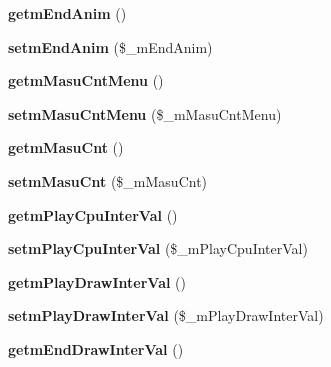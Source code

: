\begin{DoxyCompactItemize}
{\bfseries getm\+End\+Anim} ()
\item 
\mbox{\label{class_reversi_setting_aa999b168a52630ff1e339e8131589f36}} 
{\bfseries setm\+End\+Anim} (\$\+\_\+m\+End\+Anim)
\item 
\mbox{\label{class_reversi_setting_a7c7134b5c9b4920861676c8aa65fc8bf}} 
{\bfseries getm\+Masu\+Cnt\+Menu} ()
\item 
\mbox{\label{class_reversi_setting_a124deeade23c86db5106d01abd2816d3}} 
{\bfseries setm\+Masu\+Cnt\+Menu} (\$\+\_\+m\+Masu\+Cnt\+Menu)
\item 
\mbox{\label{class_reversi_setting_a32cebf699f9aa19d9053c143c3562d3a}} 
{\bfseries getm\+Masu\+Cnt} ()
\item 
\mbox{\label{class_reversi_setting_ad50e5fa90e6a2f53bf71ed04bed603ae}} 
{\bfseries setm\+Masu\+Cnt} (\$\+\_\+m\+Masu\+Cnt)
\item 
\mbox{\label{class_reversi_setting_a396427325eccd710236622c2122aef39}} 
{\bfseries getm\+Play\+Cpu\+Inter\+Val} ()
\item 
\mbox{\label{class_reversi_setting_a7e66c7132df49665538ba0e474f84134}} 
{\bfseries setm\+Play\+Cpu\+Inter\+Val} (\$\+\_\+m\+Play\+Cpu\+Inter\+Val)
\item 
\mbox{\label{class_reversi_setting_a2348e916349e5ff56f02981f5b828c64}} 
{\bfseries getm\+Play\+Draw\+Inter\+Val} ()
\item 
\mbox{\label{class_reversi_setting_aa75e022ea7334a71d2c05a5595636d33}} 
{\bfseries setm\+Play\+Draw\+Inter\+Val} (\$\+\_\+m\+Play\+Draw\+Inter\+Val)
\item 
\mbox{\label{class_reversi_setting_a33a44adbf2f49b190bb2b5f51c1c1360}} 
{\bfseries getm\+End\+Draw\+Inter\+Val} ()
\item 
\mbox{\label{class_reversi_setting_a27a5659dfe111d6cad5d9ec19e2254fb}} 

\end{DoxyCompactItemize}
